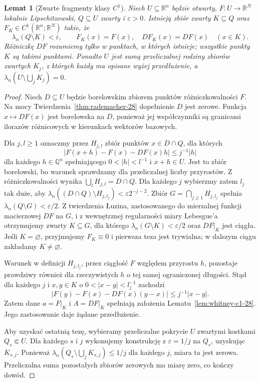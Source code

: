 \documentclass[11pt,a4paper,oneside]{book}
\numberwithin{equation}{chapter}
\theoremstyle{plain}
\newtheorem{lemat}[twierdzenie]{Lemat}
\theoremstyle{definition}
\theoremstyle{remark}
\begin{document}
\begin{lemat}[Zwarte fragmenty klasy $C^1$]
\label{lem:lusin-whitney-28}
Niech $U\subseteq\mathbb R^n$ będzie otwarty,
$F:U\to\mathbb R^N$ lokalnie Lipschitzowski,
$Q\subseteq U$ zwarty i $\varepsilon>0$.
Istnieją zbiór zwarty $K\subseteq Q$ oraz
$F_K\in C^1(\mathbb R^n;\mathbb R^N)$ takie, że
\[
 \lambda_n(Q\setminus K)<\varepsilon,\qquad
 F_K(x)=F(x),\quad DF_K(x)=DF(x)\quad(x\in K).
\]
Różniczkę $DF$ rozumiemy tylko w punktach,
w których istnieje; wszystkie punkty $K$ są
takimi punktami. Ponadto $U$ jest sumą przeliczalnej
rodziny zbiorów zwartych $K_j$, z których każdy
ma opisane wyżej przedłużenie, a
$\lambda_n(U\setminus\bigcup_jK_j)=0$.
\end{lemat}
\begin{proof}
Niech $D\subseteq U$ będzie borelowskim zbiorem
punktów różniczkowalności $F$. Na mocy
Twierdzenia~\ref{thm:rademacher-28} dopełnienie
$D$ jest zerowe. Funkcja $x\mapsto DF(x)$ jest
borelowska na $D$, ponieważ jej współczynniki
są granicami ilorazów różnicowych w kierunkach
wektorów bazowych.

Dla $j,l\ge1$ oznaczmy przez $H_{j,l}$ zbiór
punktów $x\in D\cap Q$, dla których
\[
 |F(x+h)-F(x)-DF(x)h|\le j^{-1}|h|
\]
dla każdego $h\in\mathbb Q^n$ spełniającego
$0<|h|<l^{-1}$ i $x+h\in U$. Jest to zbiór
borelowski, bo warunek sprawdzamy dla
przeliczalnej liczby przyrostów. Z różniczkowalności
wynika $\bigcup_lH_{j,l}=D\cap Q$.
Dla każdego $j$ wybierzmy zatem $l_j$ tak duże,
aby $\lambda_n((D\cap Q)\setminus H_{j,l_j})
<\varepsilon2^{-j-2}$. Zbiór
$G=\bigcap_{j\ge1}H_{j,l_j}$ spełnia
$\lambda_n(Q\setminus G)<\varepsilon/2$.
Z twierdzenia Łuzina, zastosowanego do mierzalnej
funkcji macierzowej $DF$ na $G$, i z wewnętrznej
regularności miary Lebesgue'a otrzymujemy zwarty
$K\subseteq G$, dla którego
$\lambda_n(G\setminus K)<\varepsilon/2$ oraz
$DF|_K$ jest ciągła. Jeśli $K=\varnothing$,
przyjmujemy $F_K\equiv0$ i pierwsza teza jest
trywialna; w dalszym ciągu zakładamy $K\ne\varnothing$.

Warunek w definicji $H_{j,l_j}$, przez ciągłość
$F$ względem przyrostu $h$, pozostaje prawdziwy
również dla rzeczywistych $h$ o tej samej
ograniczonej długości. Stąd dla każdego $j$ i
$x,y\in K$ o $0<|x-y|<l_j^{-1}$ zachodzi
\[
 |F(y)-F(x)-DF(x)(y-x)|\le j^{-1}|x-y|.
\]
Zatem dane $a=F|_K$ i $A=DF|_K$ spełniają
założenia Lematu~\ref{lem:whitney-c1-28}.
Jego zastosowanie daje żądane przedłużenie.

Aby uzyskać ostatnią tezę, wybieramy przeliczalne
pokrycie $U$ zwartymi kostkami $Q_s\Subset U$.
Dla każdego $s$ i $j$ wykonujemy konstrukcję
z $\varepsilon=1/j$ na $Q_s$, uzyskując
$K_{s,j}$. Ponieważ
$\lambda_n(Q_s\setminus\bigcup_jK_{s,j})\le1/j$
dla każdego $j$, miara ta jest zerowa.
Przeliczalna suma pozostałych zbiorów zerowych
ma miarę zero, co kończy dowód.
\end{proof}
\end{document}
